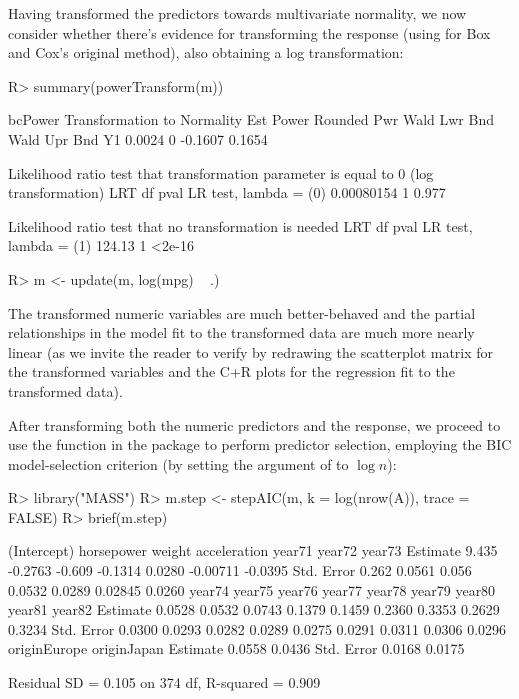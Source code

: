 \documentclass[
]{jss}
\begin{document}
Having transformed the predictors towards multivariate normality, we now
consider whether there's evidence for transforming the response (using
 for Box and Cox's original method), also
obtaining a log transformation:

\begin{CodeChunk}
\begin{CodeInput}
R> summary(powerTransform(m))
\end{CodeInput}
\begin{CodeOutput}
bcPower Transformation to Normality
   Est Power Rounded Pwr Wald Lwr Bnd Wald Upr Bnd
Y1    0.0024           0      -0.1607       0.1654

Likelihood ratio test that transformation parameter is equal to 0
 (log transformation)
                             LRT df  pval
LR test, lambda = (0) 0.00080154  1 0.977

Likelihood ratio test that no transformation is needed
                         LRT df   pval
LR test, lambda = (1) 124.13  1 <2e-16
\end{CodeOutput}
\begin{CodeInput}
R> m <- update(m, log(mpg) ~ .)
\end{CodeInput}
\end{CodeChunk}

The transformed numeric variables are much better-behaved and the
partial relationships in the model fit to the transformed data are much
more nearly linear (as we invite the reader to verify by redrawing the
scatterplot matrix for the transformed variables and the C+R plots for
the regression fit to the transformed data).

After transforming both the numeric predictors and the response, we
proceed to use the  function in the  package
to perform predictor selection, employing the BIC model-selection
criterion (by setting the  argument of  to
\(\log n\)):

\begin{CodeChunk}
\begin{CodeInput}
R> library("MASS")
R> m.step <- stepAIC(m, k = log(nrow(A)), trace = FALSE)
R> brief(m.step)
\end{CodeInput}
\begin{CodeOutput}
           (Intercept) horsepower weight acceleration year71   year72  year73
Estimate         9.435    -0.2763 -0.609      -0.1314 0.0280 -0.00711 -0.0395
Std. Error       0.262     0.0561  0.056       0.0532 0.0289  0.02845  0.0260
           year74 year75 year76 year77 year78 year79 year80 year81 year82
Estimate   0.0528 0.0532 0.0743 0.1379 0.1459 0.2360 0.3353 0.2629 0.3234
Std. Error 0.0300 0.0293 0.0282 0.0289 0.0275 0.0291 0.0311 0.0306 0.0296
           originEurope originJapan
Estimate         0.0558      0.0436
Std. Error       0.0168      0.0175

 Residual SD = 0.105 on 374 df, R-squared = 0.909
\end{CodeOutput}
\end{CodeChunk}
\end{document}
